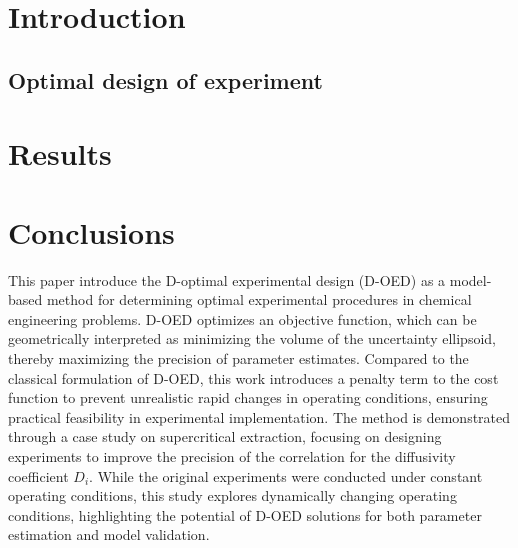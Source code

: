 \documentclass[a4paper,fleqn]{cas-dc}
\begin{document}
\maketitle


\section{Introduction}








\subsection{Optimal design of experiment} \label{CH: DOE}



\section{Results}


\section{Conclusions} \label{CH: Conclusion}
This paper introduce the D-optimal experimental design (D-OED) as a model-based method for determining optimal experimental procedures in chemical engineering problems. D-OED optimizes an objective function, which can be geometrically interpreted as minimizing the volume of the uncertainty ellipsoid, thereby maximizing the precision of parameter estimates. Compared to the classical formulation of D-OED, this work introduces a penalty term to the cost function to prevent unrealistic rapid changes in operating conditions, ensuring practical feasibility in experimental implementation. The method is demonstrated through a case study on supercritical extraction, focusing on designing experiments to improve the precision of the correlation for the diffusivity coefficient $D_i$. While the original experiments were conducted under constant operating conditions, this study explores dynamically changing operating conditions, highlighting the potential of D-OED solutions for both parameter estimation and model validation.
\end{document}
